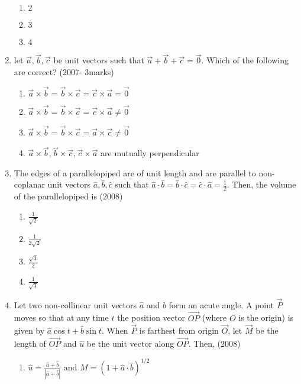 \documentclass[journal,12pt,onecolumn]{IEEEtran}
\theoremstyle{remark}
\begin{document}
\begin{enumerate}
\begin{multicols}{2}
\begin{enumerate}
    \item $2$
    \item $3$
    \item $4$
    \end{enumerate}
    \end{multicols}
    \item let $\vec{a},\vec{b},\vec{c}$ be unit vectors such that $\vec{a}+\vec{b}+\vec{c}=\vec{0}$. Which of the following are correct?
    \hfill{(2007- 3marks)}
    \begin{enumerate}
    \item $\vec{a} \times \vec{b} = \vec{b} \times \vec{c} = \vec{c} \times \vec{a} = \vec{0}$
    \item $\vec{a} \times \vec{b} = \vec{b} \times \vec{c} = \vec{c} \times \vec{a} \neq \vec{0}$
    \item $\vec{a} \times \vec{b} = \vec{b} \times \vec{c} = \vec{a} \times \vec{c} \neq \vec{0}$
    \item $\vec{a} \times \vec{b}, \vec{b} \times \vec{c}, \vec{c} \times \vec{a}$ are mutually perpendicular
    \end{enumerate}
    \item The edges of a parallelopiped are of unit length and are parallel to non-coplanar unit vectors $\hat{a},\hat{b},\hat{c}$ such that $\hat{a} \cdot \hat{b}= \hat{b} \cdot \hat{c}= \hat{c} \cdot \hat{a}= \frac{1}{2}$. Then, the volume of the parallelopiped is 
    \hfill{(2008)}
    \begin{multicols}{2}
    \begin{enumerate}
    \item $\frac{1}{\sqrt{2}}$
    \item $\frac{1}{2\sqrt{2}}$
    \item $\frac{\sqrt{3}}{2}$
    \item $\frac{1}{\sqrt{3}}$
    \end{enumerate}
    \end{multicols}
    \item Let two non-collinear unit vectors $\hat{a}$ and $\hat{b}$ form an acute angle. A point $\vec{P}$ moves so that at any time $t$ the position vector $\overrightarrow{OP}$ (where $O$ is the origin) is given by $\hat{a}\cos{t} + \hat{b}\sin{t}$. When $\vec{P}$ is farthest from origin $\vec{O}$, let $\vec{M}$ be the length of $\overrightarrow{OP}$ and $\hat{u}$ be the unit vector along $\overrightarrow{OP}$. Then,
    \hfill{(2008)}
    \begin{enumerate}
    \item $\hat{u} = \frac{\hat{a}+\hat{b}}{|\hat{a}+\hat{b}|} \text{ and } M = (1+\hat{a} \cdot \hat{b})^{1/2}$

\end{enumerate}
\end{enumerate}
\end{document}
